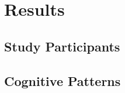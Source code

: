 \section{Results} \label{sec:results}

\subsection{Study Participants}

\subsection{Cognitive Patterns}
